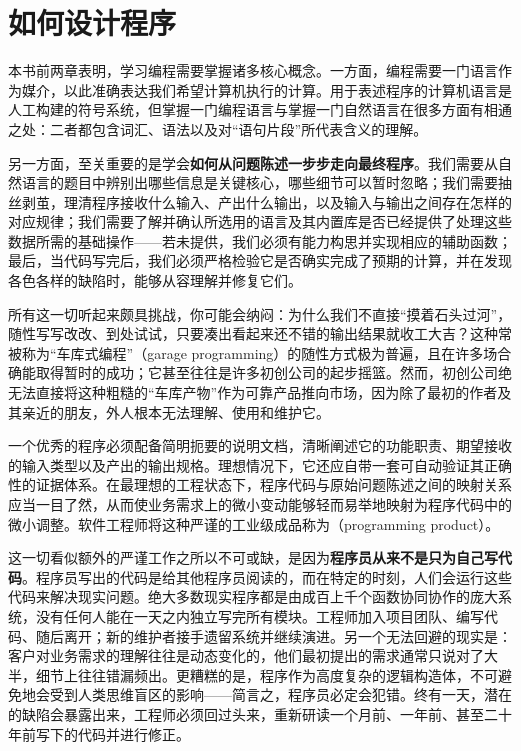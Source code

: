
\chapter{如何设计程序}
\label{sec:ch03_htdp}

本书前两章表明，学习编程需要掌握诸多核心概念。一方面，编程需要一门语言作为媒介，以此准确表达我们希望计算机执行的计算。用于表述程序的计算机语言是人工构建的符号系统，但掌握一门编程语言与掌握一门自然语言在很多方面有相通之处：二者都包含词汇、语法以及对“语句片段”所代表含义的理解。

另一方面，至关重要的是学会\textbf{如何从问题陈述一步步走向最终程序}。我们需要从自然语言的题目中辨别出哪些信息是关键核心，哪些细节可以暂时忽略；我们需要抽丝剥茧，理清程序接收什么输入、产出什么输出，以及输入与输出之间存在怎样的对应规律；我们需要了解并确认所选用的语言及其内置库是否已经提供了处理这些数据所需的基础操作——若未提供，我们必须有能力构思并实现相应的辅助函数；最后，当代码写完后，我们必须严格检验它是否确实完成了预期的计算，并在发现各色各样的缺陷时，能够从容理解并修复它们。

所有这一切听起来颇具挑战，你可能会纳闷：为什么我们不直接“摸着石头过河”，随性写写改改、到处试试，只要凑出看起来还不错的输出结果就收工大吉？这种常被称为“车库式编程”（garage programming）的随性方式极为普遍，且在许多场合确能取得暂时的成功；它甚至往往是许多初创公司的起步摇篮。然而，初创公司绝无法直接将这种粗糙的“车库产物”作为可靠产品推向市场，因为除了最初的作者及其亲近的朋友，外人根本无法理解、使用和维护它。

一个优秀的程序必须配备简明扼要的说明文档，清晰阐述它的功能职责、期望接收的输入类型以及产出的输出规格。理想情况下，它还应自带一套可自动验证其正确性的证据体系。在最理想的工程状态下，程序代码与原始问题陈述之间的映射关系应当一目了然，从而使业务需求上的微小变动能够轻而易举地映射为程序代码中的微小调整。软件工程师将这种严谨的工业级成品称为（programming product）。

这一切看似额外的严谨工作之所以不可或缺，是因为\textbf{程序员从来不是只为自己写代码}。程序员写出的代码是给其他程序员阅读的，而在特定的时刻，人们会运行这些代码来解决现实问题。绝大多数现实程序都是由成百上千个函数协同协作的庞大系统，没有任何人能在一天之内独立写完所有模块。工程师加入项目团队、编写代码、随后离开；新的维护者接手遗留系统并继续演进。另一个无法回避的现实是：客户对业务需求的理解往往是动态变化的，他们最初提出的需求通常只说对了大半，细节上往往错漏频出。更糟糕的是，程序作为高度复杂的逻辑构造体，不可避免地会受到人类思维盲区的影响——简言之，程序员必定会犯错。终有一天，潜在的缺陷会暴露出来，工程师必须回过头来，重新研读一个月前、一年前、甚至二十年前写下的代码并进行修正。

